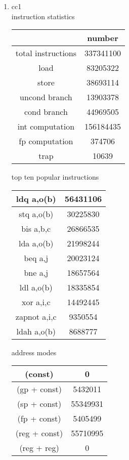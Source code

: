 \documentclass[12pt]{article}
\begin{document}
\begin{enumerate}
		\item 
		cc1\\
		instruction statistics\\
		
		\begin{tabular}{|c|c|}
		\hline
			 & number\\
		\hline
		total instructions & 337341100 \\
		\hline
load         &      83205322 \\ \hline
store         &     38693114  \\\hline
uncond branch  &    13903378  \\\hline
cond branch     &   44969505  \\\hline
int computation  & 156184435  \\\hline
fp computation    &   374706  \\\hline
trap               &   10639   \\\hline
		
		\end{tabular}		
		

		\newpage
		top ten popular instructions\\
		\begin{tabular}{|c|c|}
		\hline
		ldq      a,o(b)  &  56431106 \\ 
 		\hline
		stq      a,o(b)  &  30225830 \\ 
 		\hline
		bis      a,b,c  &  26866535 \\ 
 		\hline
		lda      a,o(b)  &  21998244 \\ 
 		\hline
		beq      a,j  &  20023124 \\ 
 		\hline
		bne      a,j  &  18657564 \\ 
 		\hline
		ldl      a,o(b)  &  18335854 \\ 
 		\hline
		xor      a,i,c  &  14492445 \\ 
 		\hline
		zapnot   a,i,c  &  9350554 \\ 
 		\hline
		ldah     a,o(b)  &  8688777 \\ 
 		\hline
		\end{tabular}


		address modes\\
		\begin{tabular}{|c|c|}
		\hline
		(const)          &         0  \\ \hline
		(gp + const)      &   5432011   \\ \hline
		(sp + const)      &  55349931  \\ \hline
		(fp + const)      &   5405499   \\ \hline
		(reg + const)     &  55710995   \\ \hline
		(reg + reg)       &        0   \\
 		\hline
		\end{tabular}
		

\end{enumerate}
\end{document}
